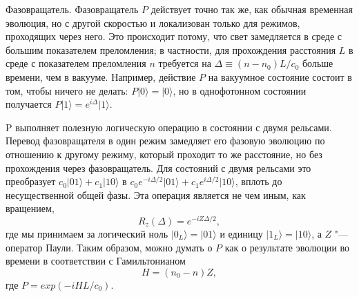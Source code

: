 \begin{multicols}{2}
{        Фазовращатель. Фазовращатель $P$ действует точно так же, как обычная временная эволюция, но с другой скоростью и локализован только для режимов, проходящих через него. Это происходит потому, что свет замедляется в среде с большим показателем преломления; 
        в частности, для прохождения расстояния $L$ в среде с показателем преломления $n$ требуется на $\Delta\equiv(n-n_0)L/c_0$ больше времени, чем в вакууме. 
        Например, действие $P$ на вакуумное состояние состоит в том, чтобы ничего не делать: $P\vert0\rangle = \vert0\rangle$, но в однофотонном состоянии получается $P\vert1\rangle = e^{i\Delta}\vert1\rangle$. 

        P выполняет полезную логическую операцию в состоянии с двумя рельсами. Перевод фазовращателя в
        один режим замедляет его фазовую эволюцию по отношению к другому режиму, который проходит то же расстояние, но без прохождения через фазовращатель. Для состояний с двумя рельсами это преобразует 
        $c_0\vert01\rangle+c_1\vert10\rangle$ в $c_0e^{-i\Delta/2}\vert01\rangle+c_1e^{i\Delta/2}\vert10\rangle$, вплоть до несущественной общей фазы. Эта операция является не чем иным, как вращением,
        \begin{equation}
            R_{z}(\Delta)=e^{-iZ\Delta/2},
        \end{equation}
        где мы принимаем за логический ноль $\vert0_{L}\rangle=\vert01\rangle$ и единицу $\vert1_{L}\rangle=\vert10\rangle$, а $Z$ "--- оператор Паули. 
        Таким образом, можно думать о $P$ как о результате эволюции во времени в соответствии с Гамильтонианом
        \begin{equation}
            H=(n_0-n)Z,
        \end{equation}
        где $P=exp(-iHL/c_0).$

}
\end{multicols}
